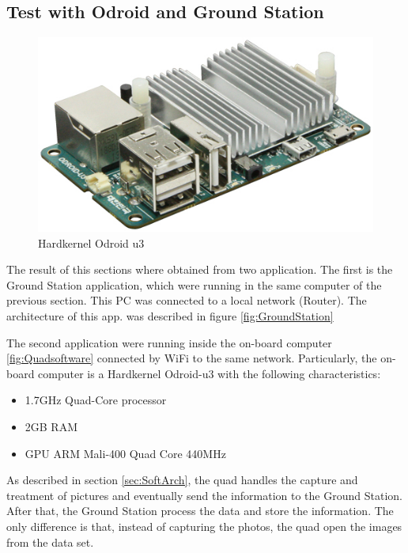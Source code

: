 	\newpage
	
\subsection{Test with Odroid and Ground Station}
	\label{test_with_odroid_and_GT}
	
	\begin{figure}
		\includegraphics[width=\linewidth]{../Images/c4/odroidu3}
		\caption{Hardkernel Odroid u3}
		\label{fig:odroidu3}
	\end{figure}
		
	The result of this sections where obtained from two application. The first is the Ground Station application, which were running in the same computer of the previous section. This PC was connected to a local network (Router). The architecture of this app.  was described in figure \ref{fig:GroundStation}
	
	The second application were running inside the on-board computer \ref{fig:Quadsoftware} connected by WiFi to the same network. Particularly, the on-board computer is a Hardkernel Odroid-u3 with the following characteristics:
	
	
	\begin{itemize}
		\item 1.7GHz Quad-Core processor 
		\item 2GB RAM
		\item GPU ARM Mali-400 Quad Core 440MHz  
	\end{itemize}
	
	As described in section \ref{sec:SoftArch}, the quad handles the capture and treatment of pictures and eventually send the information to the Ground Station. After that, the Ground Station process the data and store the information. The only difference is that, instead of capturing the photos, the quad open the images from the data set.
	
